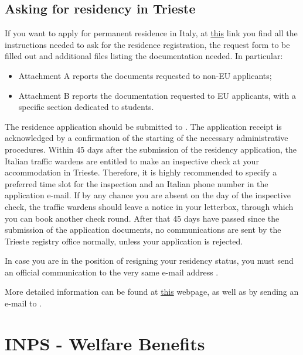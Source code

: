 \documentclass{sissavademecum}
\begin{document}
\section{Asking for residency in Trieste}

If you want to apply for permanent residence in Italy, at \href{https://www.comune.trieste.it/-/anagrafe-iscrizioneperresidenza?inheritRedirect=true}{this} link you find all the instructions needed to ask for the residence registration, the request form to be filled out and additional files listing the documentation needed. In particular:
\begin{itemize}
	\item Attachment A reports the documents requested to non-EU applicants;
	\item Attachment B reports the documentation requested to EU applicants, with a specific section dedicated to students.
\end{itemize}

The residence application should be submitted to . The application receipt is acknowledged by a confirmation of the starting of the necessary administrative procedures. Within 45 days after the submission of the residency application, the Italian traffic wardens are entitled to make an inspective check at your accommodation in Trieste. Therefore, it is highly recommended to specify a preferred time slot for the inspection and an Italian phone number in the application e-mail. If by any chance you are absent on the day of the inspective check, the traffic wardens should leave a notice in your letterbox, through which you can book another check round. After that 45 days have passed since the submission of the application documents, no communications are sent by the Trieste registry office normally, unless your application is rejected.

In case you are in the position of resigning your residency status, you must send an official communication to the very same e-mail address .

More detailed information can be found at \href{http://www.welcomeoffice.fvg.it/practical-info/entry-and-stay/residence-registration-iscrizione-anagrafica/}{this} webpage, as well as by sending an e-mail to .


\chapter{INPS - Welfare Benefits}
\label{sec:gestione_separata_inps}
\end{document}
